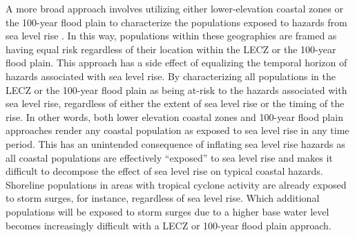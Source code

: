 \documentclass[12pt,]{article}
\begin{document}
A more broad approach involves utilizing either lower-elevation coastal
zones or the 100-year flood plain to characterize the populations
exposed to hazards from sea level rise
\citep{hallegatte2011assessing, neumann2015future}. In this way,
populations within these geographies are framed as having equal risk
regardless of their location within the LECZ or the 100-year flood
plain. This approach has a side effect of equalizing the temporal
horizon of hazards associated with sea level rise. By characterizing all
populations in the LECZ or the 100-year flood plain as being at-risk to
the hazards associated with sea level rise, regardless of either the
extent of sea level rise or the timing of the rise. In other words, both
lower elevation coastal zones and 100-year flood plain approaches render
any coastal population as exposed to sea level rise in any time period.
This has an unintended consequence of inflating sea level rise hazards
as all coastal populations are effectively ``exposed'' to sea level rise
and makes it difficult to decompose the effect of sea level rise on
typical coastal hazards. Shoreline populations in areas with tropical
cyclone activity are already exposed to storm surges, for instance,
regardless of sea level rise. Which additional populations will be
exposed to storm surges due to a higher base water level becomes
increasingly difficult with a LECZ or 100-year flood plain approach.
\end{document}
